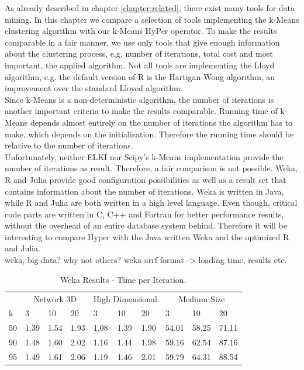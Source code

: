 As already described in chapter \ref{chapter:related}, there exist many tools for data mining. In this chapter we compare a selection of tools implementing the k-Means clustering algorithm with our k-Means HyPer operator. To make the results comparable in a fair manner, we use only tools that give enough information about the clustering process, e.g. number of iterations, total cost and most important, the applied algorithm. Not all tools are implementing the Lloyd algorithm, e.g. the default version of R is the Hartigan-Wong algorithm, an improvement over the standard Lloyed algorithm.
\\
Since k-Means is a non-deterministic algorithm, the number of iterations is another important criteria to make the results comparable. Running time of k-Means depends almost entirely on the number of iterations the algorithm has to make, which depends on the initialization. Therefore the running time should be relative to the number of iterations.
\\
Unfortunately, neither ELKI nor Scipy’s k-Means implementation provide the number of iterations as result. Therefore, a fair comparison is not possible. Weka, R and Julia provide good configuration possibilities as well as a result set that contains information about the number of iterations. Weka is written in Java, while R and Julia are both written in a high level language. Even though, critical code parts are written in C, C++ and Fortran for better performance results, without the overhead of an entire database system behind. Therefore it will be interesting to compare Hyper with the Java written Weka and the optimized R and Julia.
\\
weka, big data?
why not others?
weka arrf format -> loading time, results etc.

\begin{table}[htsb]
  \caption[Weka Results - Time per Iteration]{Weka Results - Time per Iteration.}
  \label{tab:weka_final}
  \centering
  \begin{tabular}{l l l l l l l l l l }
    \toprule
      & \multicolumn{3}{c}{Network 3D} & \multicolumn{3}{c}{High Dimensional} & \multicolumn{3}{c}{Medium Size}  \\
      k & 3 & 10 & 20 & 3 & 10 & 20 & 3 & 10 & 20 \\
    \midrule
      50  & 1.39 & 1.54 & 1.93 & 1.08 & 1.39 & 1.90 & 54.01 & 58.25 & 71.11 \\
      90  & 1.48 & 1.60 & 2.02 & 1.16 & 1.44 & 1.98 &59.16 & 62.54 & 87.16 \\
      95  & 1.49 & 1.61 & 2.06 & 1.19 & 1.46 & 2.01 & 59.79 & 64.31 & 88.54 \\
    \bottomrule
  \end{tabular}
\end{table}



